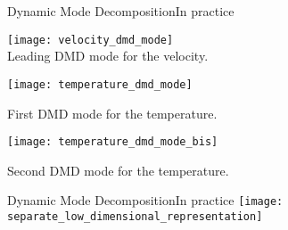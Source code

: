 \begin{frame}[t, c]{Dynamic Mode Decomposition}{In practice}
  \begin{minipage}{.32\textwidth}
    \centering
    \texttt{[image: velocity\_dmd\_mode]} \\
    
    {\small
      Leading DMD mode for the velocity.
    }
  \end{minipage}%
  \hfill
  \begin{minipage}{.32\textwidth}
    \centering
    \texttt{[image: temperature\_dmd\_mode]}
    
    {\small
      First DMD mode for the temperature.
    }
  \end{minipage}%
  \hfill
  \begin{minipage}{.32\textwidth}
    \centering
    \texttt{[image: temperature\_dmd\_mode\_bis]}
    
    {
      \small
      Second DMD mode for the temperature.
    }
  \end{minipage}
  
  \vspace{1cm}
\end{frame}

\begin{frame}[t, c]{Dynamic Mode Decomposition}{In practice}
  \centering
  \texttt{[image: separate\_low\_dimensional\_representation]}
  
  \vspace{1cm}
\end{frame}
